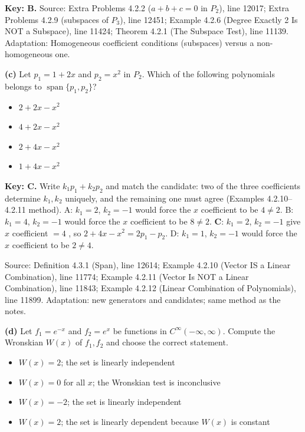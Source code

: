 \documentclass[11pt,a4paper]{article}
\newcommand{\Src}[1]{{\footnotesize\color{black!65}Source: #1}}
\begin{document}
\textbf{Key: B.} \Src{Extra Problems 4.2.2 ($a+b+c=0$ in $P_2$), line 12017; Extra Problems 4.2.9 (subspaces of $P_3$), line 12451; Example 4.2.6 (Degree Exactly 2 Is NOT a Subspace), line 11424; Theorem 4.2.1 (The Subspace Test), line 11139. Adaptation: Homogeneous coefficient conditions (subspaces) versus a non-homogeneous one.}\par
{}\textbf{(c)} Let $p_1=1+2x$ and $p_2=x^{2}$ in $P_2$. Which of the following polynomials belongs to $\operatorname{span}\{p_1,p_2\}$?\par
\begin{itemize}[leftmargin=8mm,itemsep=0pt]\item[A] $2+2x-x^{2}$\item[B] $4+2x-x^{2}$\item[C$^{\ast}$] $2+4x-x^{2}$\item[D] $1+4x-x^{2}$\end{itemize}
\textbf{Key: C.} Write $k_1p_1+k_2p_2$ and match the candidate: two of the three coefficients determine $k_1,k_2$ uniquely, and the remaining one must agree (Examples 4.2.10--4.2.11 method). A: $k_1=2$, $k_2=-1$ would force the $x$ coefficient to be $4\neq2$. B: $k_1=4$, $k_2=-1$ would force the $x$ coefficient to be $8\neq2$. \textbf{C}: $k_1=2$, $k_2=-1$ give $x$ coefficient $=4$ \checkmark, so $2+4x-x^{2}=2p_1-p_2$. D: $k_1=1$, $k_2=-1$ would force the $x$ coefficient to be $2\neq4$.\par
\Src{Definition 4.3.1 (Span), line 12614; Example 4.2.10 (Vector IS a Linear Combination), line 11774; Example 4.2.11 (Vector Is NOT a Linear Combination), line 11843; Example 4.2.12 (Linear Combination of Polynomials), line 11899. Adaptation: new generators and candidates; same method as the notes.}\par
{}\textbf{(d)} Let $f_1=e^{-x}$ and $f_2=e^{x}$ be functions in $C^{\infty}(-\infty,\infty)$. Compute the Wronskian $W(x)$ of $f_1,f_2$ and choose the correct statement.\par
\begin{itemize}[leftmargin=8mm,itemsep=0pt]\item[A$^{\ast}$] $W(x)=2$; the set is linearly independent\item[B] $W(x)=0$ for all $x$; the Wronskian test is inconclusive\item[C] $W(x)=-2$; the set is linearly independent\item[D] $W(x)=2$; the set is linearly dependent because $W(x)$ is constant\end{itemize}
\end{document}
